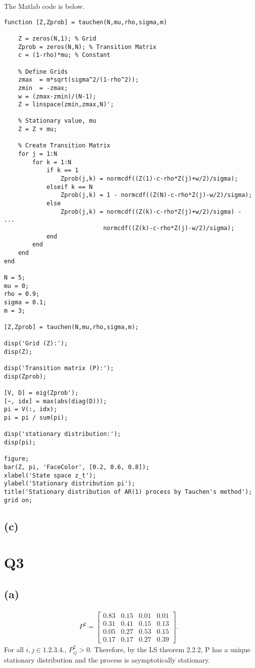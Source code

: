 \documentclass{ltjsarticle}
\begin{document}
The Matlab code is below.
\lstset{style=matlab}
\begin{lstlisting}
function [Z,Zprob] = tauchen(N,mu,rho,sigma,m)

    Z = zeros(N,1); % Grid
    Zprob = zeros(N,N); % Transition Matrix
    c = (1-rho)*mu; % Constant

    % Define Grids 
    zmax  = m*sqrt(sigma^2/(1-rho^2));
    zmin  = -zmax;
    w = (zmax-zmin)/(N-1);
    Z = linspace(zmin,zmax,N)';

    % Stationary value, mu
    Z = Z + mu;

    % Create Transition Matrix
    for j = 1:N
        for k = 1:N
            if k == 1
                Zprob(j,k) = normcdf((Z(1)-c-rho*Z(j)+w/2)/sigma);
            elseif k == N
                Zprob(j,k) = 1 - normcdf((Z(N)-c-rho*Z(j)-w/2)/sigma);
            else
                Zprob(j,k) = normcdf((Z(k)-c-rho*Z(j)+w/2)/sigma) - ...
                            normcdf((Z(k)-c-rho*Z(j)-w/2)/sigma);
            end
        end
    end
end

N = 5;
mu = 0;
rho = 0.9;
sigma = 0.1;
m = 3;

[Z,Zprob] = tauchen(N,mu,rho,sigma,m);

disp('Grid (Z):');
disp(Z);

disp('Transition matrix (P):');
disp(Zprob);

[V, D] = eig(Zprob');
[~, idx] = max(abs(diag(D)));
pi = V(:, idx); 
pi = pi / sum(pi);

disp('stationary distribution:');
disp(pi);

figure;
bar(Z, pi, 'FaceColor', [0.2, 0.6, 0.8]);
xlabel('State space z_t');
ylabel('Stationary distribution pi');
title('Stationary distribution of AR(1) process by Tauchen's method');
grid on;
\end{lstlisting}

\subsection*{(c)}


\section*{Q3}
\subsection*{(a)}
\begin{align*}
P^2 = 
    \begin{bmatrix}
    0.83 & 0.15 & 0.01 & 0.01 \\
    0.31 & 0.41 & 0.15 & 0.13 \\
    0.05 & 0.27 & 0.53 & 0.15 \\
    0.17 & 0.17 & 0.27 & 0.39
    \end{bmatrix}.
\end{align*}
For all $i,j\in \qty{1,2,3,4,}$, $P^2_{ij}>0$. Therefore, by the LS theorem 2.2.2, P has a unique stationary distribution and the process is
asymptotically stationary.
\end{document}
